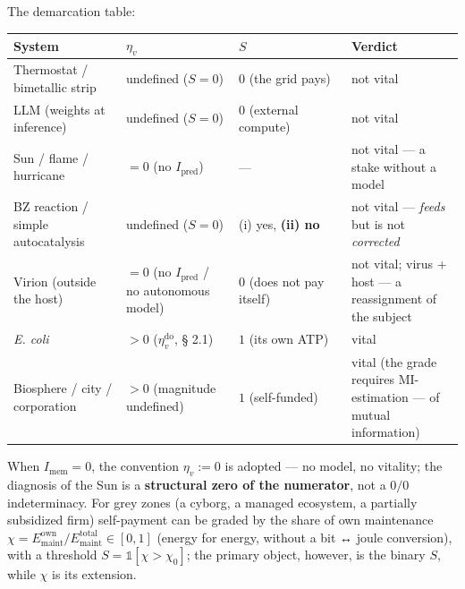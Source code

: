 \documentclass[pdflatex,sn-mathphys-ay]{sn-jnl}
\begin{document}
The demarcation table:

\begin{center}\small
\begin{tabular}{@{} >{\raggedright\arraybackslash}p{0.2500\linewidth} >{\raggedright\arraybackslash}p{0.2500\linewidth} >{\raggedright\arraybackslash}p{0.2500\linewidth} >{\raggedright\arraybackslash}p{0.2500\linewidth}@{}}
\toprule
\begin{minipage}[b]{\linewidth}\raggedright
System
\end{minipage} & \begin{minipage}[b]{\linewidth}\raggedright
\(\eta_v\)
\end{minipage} & \begin{minipage}[b]{\linewidth}\raggedright
\(S\)
\end{minipage} & \begin{minipage}[b]{\linewidth}\raggedright
Verdict
\end{minipage} \\
\midrule
Thermostat / bimetallic strip & undefined (\(S=0\)) & \(0\) (the grid pays) & not vital \\
LLM (weights at inference) & undefined (\(S=0\)) & \(0\) (external compute) & not vital \\
Sun / flame / hurricane & \(= 0\) (no \(I_{\text{pred}}\)) & --- & not vital --- a stake without a model \\
BZ reaction / simple autocatalysis & undefined (\(S=0\)) & (i) yes, \textbf{(ii) no} & not vital --- \emph{feeds} but is not \emph{corrected} \\
Virion (outside the host) & \(= 0\) (no \(I_{\text{pred}}\) / no autonomous model) & \(0\) (does not pay itself) & not vital; virus + host --- a reassignment of the subject \\
\emph{E. coli} & \(> 0\) (\(\eta_v^{\mathrm{do}}\), § 2.1) & \(1\) (its own ATP) & vital \\
Biosphere / city / corporation & \(> 0\) (magnitude undefined) & \(1\) (self-funded) & vital (the grade requires MI-estimation --- of mutual information) \\
\bottomrule
\end{tabular}
\end{center}

When \(I_{\text{mem}} = 0\), the convention \(\eta_v := 0\) is adopted --- no model, no vitality; the diagnosis of the Sun is a \textbf{structural zero of the numerator}, not a \(0/0\) indeterminacy. For grey zones (a cyborg, a managed ecosystem, a partially subsidized firm) self-payment can be graded by the share of own maintenance \(\chi = E_{\text{maint}}^{\text{own}}/E_{\text{maint}}^{\text{total}} \in [0, 1]\) (energy for energy, without a bit ↔ joule conversion), with a threshold \(S = \mathbb{1}[\chi > \chi_0]\); the primary object, however, is the binary \(S\), while \(\chi\) is its extension.
\end{document}
